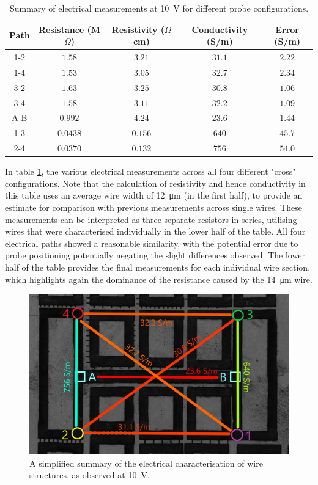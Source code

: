 \begin{refsection}
\begin{table}[ht]
\centering
\begin{tabular}{|c|c|c|c|c|}
\hline
Path & Resistance (M$\Omega$) & Resistivity ($\Omega$cm) & Conductivity (S/m) & Error (S/m) \\
\hline
1-2 & $1.58$ & $3.21$ & $31.1$ & $2.22$ \\
1-4 & $1.53$ & $3.05$ & $32.7$ & $2.34$ \\
3-2 & $1.63$ & $3.25$ & $30.8$ & $1.06$ \\
3-4 & $1.58$ & $3.11$ & $32.2$ & $1.09$ \\
\hline
A-B & $0.992$ & $4.24$ & $23.6$ & $1.44$ \\
1-3 & $0.0438$ & $0.156$ & $640$ & $45.7$ \\
2-4 & $0.0370$ & $0.132$ & $756$ & $54.0$ \\
\hline
\end{tabular}
\caption{Summary of electrical measurements at 10~\si{\volt} for different probe configurations.}
\label{table:electrical_measurements_10v_all}
\end{table}

In table \ref{table:electrical_measurements_10v_all}, the various electrical measurements across all four different "cross" configurations. Note that the calculation of resistivity and hence conductivity in this table uses an average wire width of 12~\si{\micro\metre} (in the first half), to provide an estimate for comparison with previous measurements across single wires. These measurements can be interpreted as three separate resistors in series, utilising wires that were characterised individually in the lower half of the table. All four electrical paths showed a reasonable similarity, with the potential error due to probe positioning potentially negating the slight differences observed. The lower half of the table provides the final measurements for each individual wire section, which highlights again the dominance of the resistance caused by the 14~\si{\micro\metre} wire.

\begin{figure}[H]
    \centering
    \includegraphics[width=\linewidth]{Chapter7/Figs/Raster/big_bone_esid_annotated_2.jpg}
    \caption{A simplified summary of the electrical characterisation of wire structures, as observed at 10~\si{\volt}.}
    \label{fig:big_bone_esid_2}
\end{figure}


\end{refsection}
